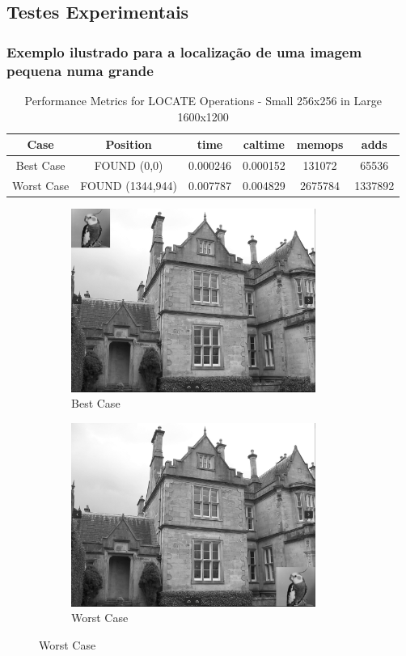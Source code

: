 \documentclass{report}
\begin{document}
\subsection{Testes Experimentais}


\subsubsection{Exemplo ilustrado para a localização de uma imagem pequena numa grande }

\begin{table}[h]
    \centering
    \begin{tabular}{cccccc}
        \toprule
        \textbf{Case} & \textbf{Position} & \textbf{time} & \textbf{caltime} & \textbf{memops} & \textbf{adds}\\
        \midrule
        Best Case & FOUND (0,0) & 0.000246 & 0.000152 & 131072 & 65536 \\
        Worst Case & FOUND (1344,944) & 0.007787 & 0.004829 & 2675784 & 1337892 \\
        \bottomrule
    \end{tabular}
    \caption{Performance Metrics for LOCATE Operations - Small 256x256 in Large 1600x1200}
\end{table}


\begin{figure}[h]

\begin{subfigure}{0.5\textwidth}
\includegraphics[width=0.9\linewidth, height=6cm]{Screenshot from 2023-11-23 03-27-09.png} 
\caption{Best Case}
\end{subfigure}
\begin{subfigure}{0.5\textwidth}
\includegraphics[width=0.9\linewidth, height=6cm]{Screenshot from 2023-11-23 03-26-59.png}
\caption{Worst Case}
\end{subfigure}
\label{Robos}
\end{figure}
\end{document}
